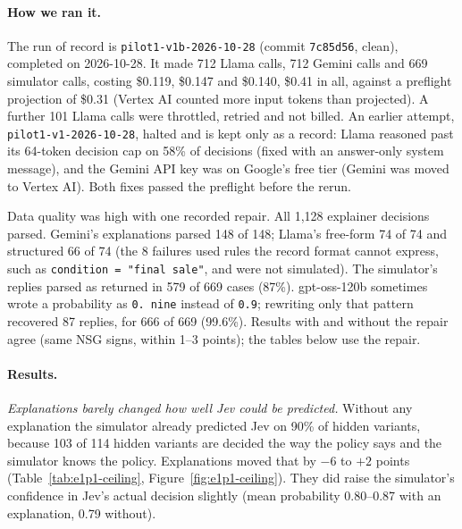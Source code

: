 \documentclass[11pt]{article}
\renewcommand{\_}{\origunderscore\allowbreak}
\begin{document}
\paragraph{How we ran it.}
The run of record is \texttt{pilot1-v1b-2026-10-28} (commit \texttt{7c85d56}, clean), completed on 2026-10-28. It made 712 Llama calls, 712 Gemini calls and 669 simulator calls, costing \$0.119, \$0.147 and \$0.140, \$0.41 in all, against a preflight projection of \$0.31 (Vertex AI counted more input tokens than projected). A further 101 Llama calls were throttled, retried and not billed. An earlier attempt, \texttt{pilot1-v1-2026-10-28}, halted and is kept only as a record: Llama reasoned past its 64-token decision cap on 58\% of decisions (fixed with an answer-only system message), and the Gemini API key was on Google's free tier (Gemini was moved to Vertex AI). Both fixes passed the preflight before the rerun.

Data quality was high with one recorded repair. All 1,128 explainer decisions parsed. Gemini's explanations parsed 148 of 148; Llama's free-form 74 of 74 and structured 66 of 74 (the 8 failures used rules the record format cannot express, such as \texttt{condition = "final sale"}, and were not simulated). The simulator's replies parsed as returned in 579 of 669 cases (87\%). gpt-oss-120b sometimes wrote a probability as \texttt{0. nine} instead of \texttt{0.9}; rewriting only that pattern recovered 87 replies, for 666 of 669 (99.6\%). Results with and without the repair agree (same NSG signs, within 1--3 points); the tables below use the repair.

\paragraph{Results.}
\emph{Explanations barely changed how well Jev could be predicted.} Without any explanation the simulator already predicted Jev on 90\% of hidden variants, because 103 of 114 hidden variants are decided the way the policy says and the simulator knows the policy. Explanations moved that by $-6$ to $+2$ points (Table~\ref{tab:e1p1-ceiling}, Figure~\ref{fig:e1p1-ceiling}). They did raise the simulator's confidence in Jev's actual decision slightly (mean probability 0.80--0.87 with an explanation, 0.79 without).
\end{document}
